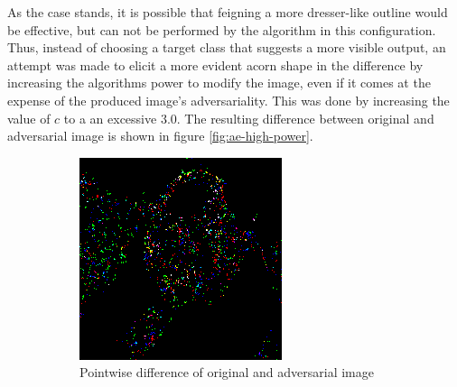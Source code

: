 \documentclass[11pt, a4paper]{article}
\begin{document}
As the case stands, it is possible that feigning a more dresser-like outline would be effective, but can not be performed by the algorithm in this configuration. Thus, instead of choosing a target class that suggests a more visible output, an attempt was made to elicit a more evident acorn shape in the difference by increasing the algorithms power to modify the image, even if it comes at the expense of the produced image's adversariality. This was done by increasing the value of $c$ to a an excessive $3.0$. The resulting difference between original and adversarial image is shown in figure \ref{fig:ae-high-power}.

\begin{figure}[h!tb]
    \centering
    \begin{subfigure}[b]{0.45\textwidth}
        \includegraphics[width=\textwidth]{aes_new/panda_acorn_10_3dot0_posdiff.png}
        \caption{Pointwise difference of original and adversarial image}
        \label{fig:ae-high-power-img}
    \end{subfigure}
    ~ %
    \begin{subfigure}[b]{0.45\textwidth}

\end{subfigure}
\end{figure}
\end{document}
